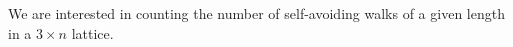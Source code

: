 We are interested in counting the number of self-avoiding walks of a given length in a $3\times n$ lattice. 
